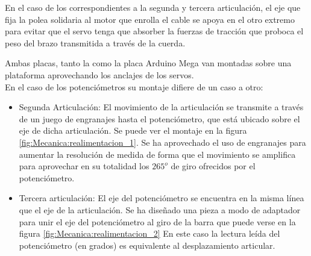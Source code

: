     En el caso de los correspondientes a la segunda y tercera articulación, el eje que fija la polea solidaria al motor que enrolla el cable se apoya en el otro extremo para evitar que el servo tenga que absorber la fuerzas de tracción que proboca el peso del brazo transmitida a través de la cuerda.


    Ambas placas, tanto la  como la placa Arduino Mega van montadas sobre una plataforma aprovechando los anclajes de los servos.
    \\

    En el caso de los potenciómetros su montaje difiere de un caso a otro:
    \begin{itemize}
        \item Segunda Articulación: El movimiento de la articulación se transmite a través de un juego de engranajes hasta el potenciómetro, que está ubicado sobre el eje de dicha articulación. Se puede ver el montaje en la figura \ref{fig:Mecanica:realimentacion_1}. Se ha aprovechado el uso de engranajes para aumentar la resolución de medida de forma que el movimiento se amplifica para aprovechar en su totalidad los $265^o$ de giro ofrecidos por el potenciómetro.
        \item Tercera articulación: El eje del potenciómetro se encuentra en la misma línea que el eje de la articulación. Se ha diseñado una pieza a modo de adaptador para unir el eje del potenciómetro al giro de la barra que puede verse en la figura \ref{fig:Mecanica:realimentacion_2} En este caso la lectura leída del potenciómetro (en grados) es equivalente al desplazamiento articular.
    \end{itemize}

